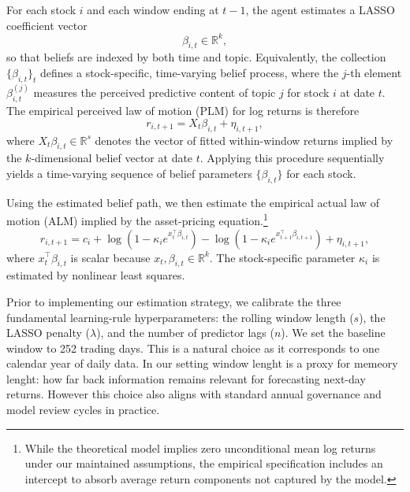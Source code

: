 \documentclass[11pt]{article}
\begin{document}
For each stock \(i\) and each window ending at \(t-1\), the agent estimates a LASSO
coefficient vector
\begin{equation}
\beta_{i,t} \in \mathbb{R}^{k},
\end{equation}
so that beliefs are indexed by both time and topic. Equivalently, the collection
\(\{\beta_{i,t}\}_t\) defines a stock-specific, time-varying belief process, where the
\(j\)-th element \(\beta_{i,t}^{(j)}\) measures the perceived predictive content of topic \(j\)
for stock \(i\) at date \(t\).
The empirical perceived law of motion (PLM) for log returns is therefore
\begin{equation}\label{eq:empirical_plm}
r_{i,t+1} = X_t \beta_{i,t} + \eta_{i,t+1},
\end{equation}
where \(X_t \beta_{i,t} \in \mathbb{R}^{s}\) denotes the vector of fitted within-window returns
implied by the \(k\)-dimensional belief vector at date \(t\).
Applying this procedure sequentially yields a time-varying sequence of belief parameters
\(\{\beta_{i,t}\}\) for each stock.

Using the estimated belief path, we then estimate the empirical actual law of motion
(ALM) implied by the asset-pricing equation.\footnote{While the theoretical model implies
zero unconditional mean log returns under our maintained assumptions, the empirical
specification includes an intercept to absorb average return components not captured by
the model.}
\begin{equation}\label{eq:empirical_alm}
r_{i,t+1}
= c_i
+ \log\!\left(1 - \kappa_i e^{x_t^\top \beta_{i,t}}\right)
- \log\!\left(1 - \kappa_i e^{x_{t+1}^\top \beta_{i,t+1}}\right)
+ \eta_{i,t+1},
\end{equation}
where \(x_t^\top \beta_{i,t}\) is scalar because \(x_t, \beta_{i,t} \in \mathbb{R}^{k}\).
The stock-specific parameter \(\kappa_i\) is estimated by nonlinear least squares.


Prior to implementing our estimation strategy, we calibrate the three fundamental learning-rule hyperparameters: the rolling window length ($s$), the LASSO penalty ($\lambda$), and the number of predictor lags ($n$).
We set the baseline window to 252 trading days. This is a natural choice as it corresponds to one calendar year of daily data.
In our setting window lenght is a proxy for memeory lenght: how far back information remains relevant for forecasting next-day returns.
However this choice also aligns with standard annual governance and model review cycles in practice.
\end{document}
